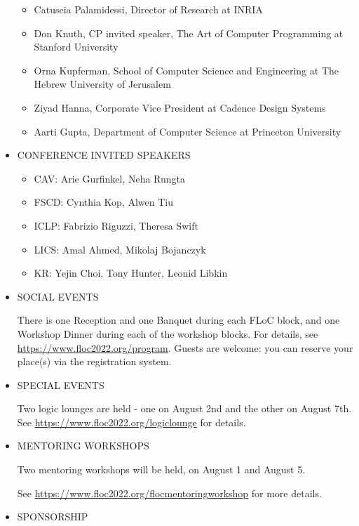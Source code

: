 \documentclass[prodmode,acmtecs]{acmsmall} %
\begin{document}
\begin{itemize}
\begin{itemize}\item  Catuscia Palamidessi, Director of Research at INRIA
\item  Don Knuth, CP invited speaker, The Art of Computer Programming at Stanford University
\item  Orna Kupferman, School of Computer Science and Engineering at The Hebrew University of Jerusalem
\item  Ziyad Hanna, Corporate Vice President at Cadence Design Systems
\item  Aarti Gupta, Department of Computer Science at Princeton University
\end{itemize} 
\item  CONFERENCE INVITED SPEAKERS 
 
\begin{itemize}\item  CAV: Arie Gurfinkel, Neha Rungta
\item  FSCD: Cynthia Kop, Alwen Tiu
\item  ICLP: Fabrizio Riguzzi, Theresa Swift
\item  LICS: Amal Ahmed, Mikolaj Bojanczyk
\item  KR: Yejin Choi, Tony Hunter, Leonid Libkin
\end{itemize} 
\item  SOCIAL EVENTS 
 
  There is one Reception and one Banquet during each FLoC block, and one Workshop Dinner during each of the workshop blocks. For details, see \href{https://www.floc2022.org/program}{https://www.floc2022.org/program}. Guests are welcome: you can reserve your place(s) via the registration system. 
 
\item  SPECIAL EVENTS 
 
  Two logic lounges are held - one on August 2nd and the other on August 7th. See \href{https://www.floc2022.org/logiclounge}{https://www.floc2022.org/logiclounge} for details. 
 
\item  MENTORING WORKSHOPS 
 
  Two mentoring workshops will be held, on August 1 and August 5. 
 
  See \href{https://www.floc2022.org/flocmentoringworkshop}{https://www.floc2022.org/flocmentoringworkshop} for more details. 
 
\item  SPONSORSHIP 
 

\end{itemize}
\end{document}
